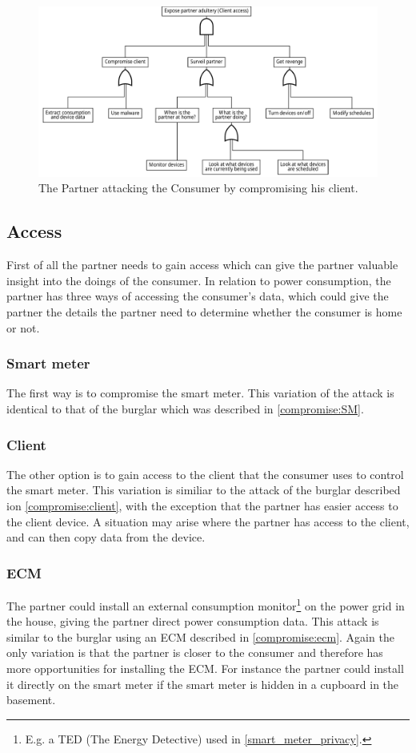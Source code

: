 \begin{figure}[h]
  \includegraphics[width=\textwidth]{figures/graphviz/partner_vs_consumer_client.pdf}
  \caption{The Partner attacking the Consumer by compromising his client.}
  \label{fig:attack_trees:partner:cheater_client}
\end{figure}


\subsection{Access}
First of all the partner needs to gain access which can give the partner valuable insight into the doings of the consumer.
In relation to power consumption, the partner has three ways of accessing the consumer's data, which could give the partner the details the partner need to determine whether the consumer is home or not.

\subsubsection{Smart meter}
The first way is to compromise the smart meter.
This variation of the attack is identical to that of the burglar which was described in \cref{compromise:SM}.

\subsubsection{Client}
The other option is to gain access to the client that the consumer uses to control the smart meter.
This variation is similiar to the attack of the burglar described ion \cref{compromise:client}, with the exception that the partner has easier access to the client device.
A situation may arise where the partner has access to the client, and can then copy data from the device.

\subsubsection{ECM}
The partner could install an external consumption monitor\footnote{E.g. a TED (The Energy Detective) used in \cref {smart_meter_privacy}.} on the power grid in the house, giving the partner direct power consumption data.
This attack is similar to the burglar using an ECM described in \cref{compromise:ecm}.
Again the only variation is that the partner is closer to the consumer and therefore has more opportunities for installing the ECM.
For instance the partner could install it directly on the smart meter if the smart meter is hidden in a cupboard in the basement.

